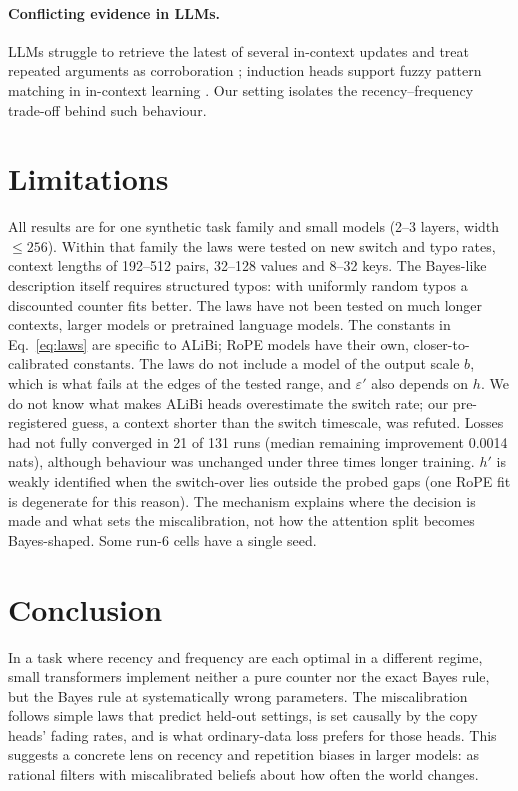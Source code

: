 \documentclass[11pt]{article}
\newcommand{\hp}{h'}
\newcommand{\ep}{\varepsilon'}
\begin{document}
\paragraph{Conflicting evidence in LLMs.} LLMs struggle to retrieve the latest of several in-context updates \citep{qiao2026diagnosing} and treat repeated arguments as corroboration \citep{naphade2026rational}; induction heads support fuzzy pattern matching in in-context learning \citep{crosbie2025induction}. Our setting isolates the recency--frequency trade-off behind such behaviour.

\section{Limitations}

All results are for one synthetic task family and small models (2--3 layers, width $\le 256$). Within that family the laws were tested on new switch and typo rates, context lengths of 192--512 pairs, 32--128 values and 8--32 keys. The Bayes-like description itself requires structured typos: with uniformly random typos a discounted counter fits better. The laws have not been tested on much longer contexts, larger models or pretrained language models. The constants in Eq.~\eqref{eq:laws} are specific to ALiBi; RoPE models have their own, closer-to-calibrated constants. The laws do not include a model of the output scale $b$, which is what fails at the edges of the tested range, and $\ep$ also depends on $h$. We do not know what makes ALiBi heads overestimate the switch rate; our pre-registered guess, a context shorter than the switch timescale, was refuted. Losses had not fully converged in 21 of 131 runs (median remaining improvement 0.0014 nats), although behaviour was unchanged under three times longer training. $\hp$ is weakly identified when the switch-over lies outside the probed gaps (one RoPE fit is degenerate for this reason). The mechanism explains where the decision is made and what sets the miscalibration, not how the attention split becomes Bayes-shaped. Some run-6 cells have a single seed.

\section{Conclusion}

In a task where recency and frequency are each optimal in a different regime, small transformers implement neither a pure counter nor the exact Bayes rule, but the Bayes rule at systematically wrong parameters. The miscalibration follows simple laws that predict held-out settings, is set causally by the copy heads' fading rates, and is what ordinary-data loss prefers for those heads. This suggests a concrete lens on recency and repetition biases in larger models: as rational filters with miscalibrated beliefs about how often the world changes.
\end{document}
